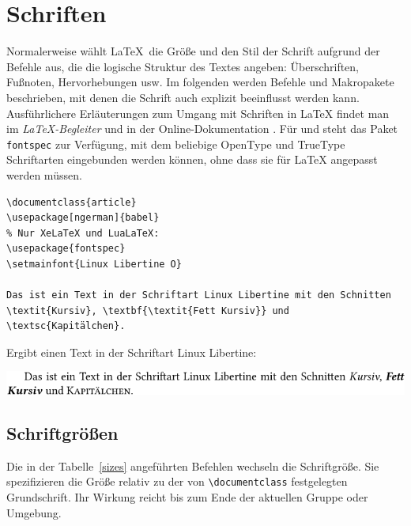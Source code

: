 

\section{Schriften}
Normalerweise wählt \LaTeX\ die Größe und den Stil der Schrift
aufgrund der Befehle aus, die die logische Struktur des Textes angeben:
Überschriften, Fußnoten, Hervorhebungen usw.
Im folgenden werden Befehle und Makropakete beschrieben, mit denen
die Schrift auch explizit beeinflusst werden kann.
Ausführlichere Erläuterungen zum Umgang mit Schriften in \LaTeX{}
findet man im \textit{\LaTeX-Begleiter} \cite{wonne}
und in der Online-Dokumentation \cite{fntguide}. Für \XeLaTeX{} und \LuaLaTeX{} steht das Paket
\texttt{fontspec} zur Verfügung, mit dem beliebige OpenType und TrueType Schriftarten eingebunden werden können, ohne dass sie für \LaTeX{} angepasst werden müssen. 

\begin{lstlisting}
\documentclass{article}
\usepackage[ngerman]{babel}
% Nur XeLaTeX und LuaLaTeX:
\usepackage{fontspec}
\setmainfont{Linux Libertine O}

Das ist ein Text in der Schriftart Linux Libertine mit den Schnitten
\textit{Kursiv}, \textbf{\textit{Fett Kursiv}} und \textsc{Kapitälchen}.

\end{lstlisting}

Ergibt einen Text in der Schriftart Linux Libertine:

\medskip

\noindent\includegraphics{fontspec}





\subsection{Schriftgrößen}
 
Die in der Tabelle~\ref{sizes} angeführten Befehlen 
wechseln die Schriftgröße.
Sie spezifizieren die Größe relativ
zu der von \lstinline:\documentclass: festgelegten Grundschrift.
Ihr Wirkung reicht bis zum Ende der aktuellen Gruppe oder Umgebung.


